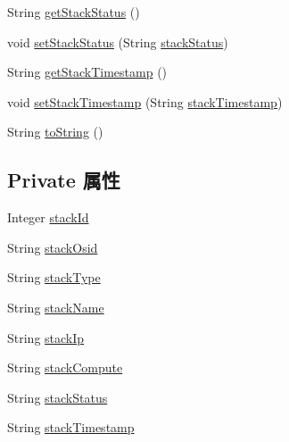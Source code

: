 \begin{DoxyCompactItemize}
\item 
String \mbox{\hyperlink{classcom_1_1example_1_1demo_1_1modular_1_1_stack_abe7a0456d80e0cc07980d768a923b806}{get\+Stack\+Status}} ()
\item 
void \mbox{\hyperlink{classcom_1_1example_1_1demo_1_1modular_1_1_stack_af5b990c7d9d5edbb64dd0ffd90aa4ddc}{set\+Stack\+Status}} (String \mbox{\hyperlink{classcom_1_1example_1_1demo_1_1modular_1_1_stack_ab10e822c3d240e4132ea8cc69569c656}{stack\+Status}})
\item 
String \mbox{\hyperlink{classcom_1_1example_1_1demo_1_1modular_1_1_stack_a893cb9a8d481285b839aec25e7093ffd}{get\+Stack\+Timestamp}} ()
\item 
void \mbox{\hyperlink{classcom_1_1example_1_1demo_1_1modular_1_1_stack_a29eb9856afadbe4e2cd698298eebc3c3}{set\+Stack\+Timestamp}} (String \mbox{\hyperlink{classcom_1_1example_1_1demo_1_1modular_1_1_stack_a48dd28066eafe12d6adef0184251cd76}{stack\+Timestamp}})
\item 
String \mbox{\hyperlink{classcom_1_1example_1_1demo_1_1modular_1_1_stack_a61268fd836f8f936f0a7cb45f697f398}{to\+String}} ()
\end{DoxyCompactItemize}
\subsection*{Private 属性}
\begin{DoxyCompactItemize}
\item 
Integer \mbox{\hyperlink{classcom_1_1example_1_1demo_1_1modular_1_1_stack_a39181f285b8fb046b291930dbd9b407b}{stack\+Id}}
\item 
String \mbox{\hyperlink{classcom_1_1example_1_1demo_1_1modular_1_1_stack_aa8fd54c63bd8fbeef9689ed0790a0a2a}{stack\+Osid}}
\item 
String \mbox{\hyperlink{classcom_1_1example_1_1demo_1_1modular_1_1_stack_a0c655d23ddd865937a884dabf0190f3e}{stack\+Type}}
\item 
String \mbox{\hyperlink{classcom_1_1example_1_1demo_1_1modular_1_1_stack_ae5759a731886729bcf087959692f1542}{stack\+Name}}
\item 
String \mbox{\hyperlink{classcom_1_1example_1_1demo_1_1modular_1_1_stack_ae0bbcc492595b5920765995bfe148e69}{stack\+Ip}}
\item 
String \mbox{\hyperlink{classcom_1_1example_1_1demo_1_1modular_1_1_stack_afaed809049fbbe917b1cd5ea2e12eb71}{stack\+Compute}}
\item 
String \mbox{\hyperlink{classcom_1_1example_1_1demo_1_1modular_1_1_stack_ab10e822c3d240e4132ea8cc69569c656}{stack\+Status}}
\item 
String \mbox{\hyperlink{classcom_1_1example_1_1demo_1_1modular_1_1_stack_a48dd28066eafe12d6adef0184251cd76}{stack\+Timestamp}}
\end{DoxyCompactItemize}


